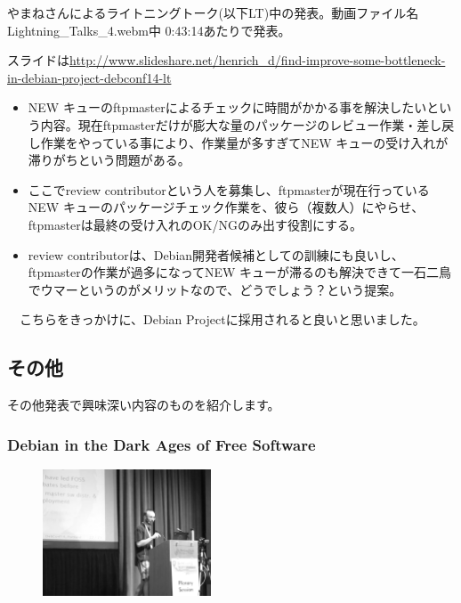 \documentclass[mingoth,a4paper]{jsarticle}
\begin{document}
 やまねさんによるライトニングトーク(以下LT)中の発表。動画ファイル名Lightning\_Talks\_4.webm中 0:43:14あたりで発表。

 スライドは\url{http://www.slideshare.net/henrich_d/find-improve-some-bottleneck-in-debian-project-debconf14-lt}

 \begin{itemize}
  \item NEW キューのftpmasterによるチェックに時間がかかる事を解決したいという内容。現在ftpmasterだけが膨大な量のパッケージのレビュー作業・差し戻し作業をやっている事により、作業量が多すぎてNEW キューの受け入れが滞りがちという問題がある。
  \item ここでreview contributorという人を募集し、ftpmasterが現在行っているNEW キューのパッケージチェック作業を、彼ら（複数人）にやらせ、ftpmasterは最終の受け入れのOK/NGのみ出す役割にする。
 \end{itemize}

 \begin{itemize}
 \item review contributorは、Debian開発者候補としての訓練にも良いし、ftpmasterの作業が過多になってNEW キューが滞るのも解決できて一石二鳥でウマーというのがメリットなので、どうでしょう？という提案。
\end{itemize}

　こちらをきっかけに、Debian Projectに採用されると良いと思いました。

\subsection{その他}

 その他発表で興味深い内容のものを紹介します。

 \subsubsection{Debian in the Dark Ages of Free Software}

\begin{figure}
  \includegraphics[width=5cm]{image201409/dark_age_mono.png}
\end{figure}
\end{document}
